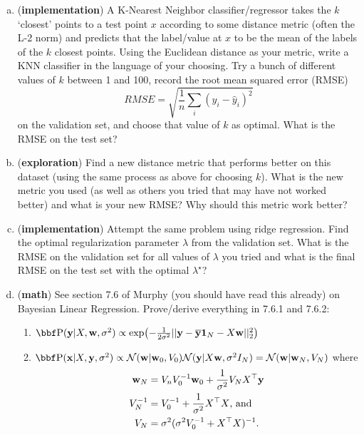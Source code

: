 \documentclass[12pt,letterpaper,fleqn]{hmcpset}
\begin{document}
\begin{enumerate}[(a)]
    \item (\textbf{implementation}) A K-Nearest Neighbor classifier/regressor
        takes the $k$ `closest' points to a test point $x$ according to some
        distance metric (often the L-2 norm) and predicts that the label/value
        at $x$ to be the mean of the labels of the $k$ closest points. Using
        the Euclidean distance as your metric, write a KNN classifier in the
        language of your choosing. Try a bunch of different values of $k$ between
        1 and 100, record the root mean squared error (RMSE)
        \[
            RMSE = \sqrt{\frac{1}{n}\sum_i (y_i - \hat y_i)^2}
        \]
        on the validation set, and choose that
        value of $k$ as optimal. What is the RMSE on the test set?
    \item (\textbf{exploration}) Find a new distance metric that performs
        better on this dataset (using the same process as above for choosing
        $k$). What is the new metric you used (as well as others you tried that
        may have not worked better)
        and what is your new RMSE? Why should this metric work better?
    \item (\textbf{implementation}) Attempt the same problem using ridge
        regression. Find the optimal regularization parameter $\lambda$
        from the validation set. What is the RMSE on the validation set
        for all values of $\lambda$ you tried and what is the final RMSE
        on the test set with the optimal $\lambda^\star$?
    \item (\textbf{math}) See section 7.6 of Murphy (you should have read this
        already) on Bayesian Linear Regression. Prove/derive everything in 7.6.1
        and 7.6.2:
        \begin{enumerate}
            \item $\PP(\yy | X,\ww, \sigma^2) \propto \exp \bigl(-\frac{1}{2\sigma^2}||\yy - \overline \yy \1_N - X\ww||_2^2\bigr)$\\
            \item $\PP(\xx|X,\yy,\sigma^2) \propto \Nc(\ww|\ww_0,V_0)\Nc(\yy|X\ww,\sigma^2 I_N) = \Nc(\ww|\ww_N, V_N)$ where
                \begin{align*}
                    \ww_N &= V_n V_0^{-1}\ww_0 + \frac{1}{\sigma^2}V_N X^\T \yy\\
                    V_N^{-1} &= V_0^{-1} + \frac{1}{\sigma^2}X^\T X\text{, and}\\
                    V_N &= \sigma^2(\sigma^2 V_0^{-1} + X^\T X)^{-1}.

\end{align*}
\end{enumerate}
\end{enumerate}
\end{document}
